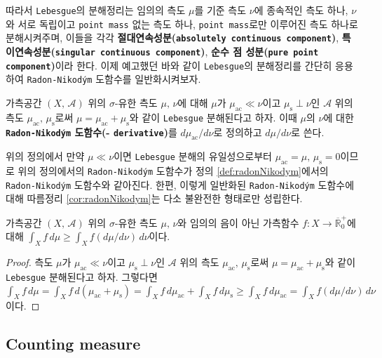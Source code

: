 따라서 \texttt{Lebesgue}의 분해정리는 임의의 측도 $\mu$를 기준 측도 $\nu$에 종속적인 측도 하나, $\nu$와 서로 독립이고 \texttt{point mass} 없는 측도 하나, \texttt{point mass}로만 이루어진 측도 하나로 분해시켜주며, 이들을 각각 \textbf{절대연속성분(\texttt{absolutely continuous component})}, \textbf{특이연속성분(\texttt{singular continuous component})}, \textbf{순수 점 성분(\texttt{pure point component})}이라 한다. 이제 예고했던 바와 같이 \texttt{Lebesgue}의 분해정리를 간단히 응용하여 \texttt{Radon-Nikod\'ym} 도함수를 일반화시켜보자.

\begin{definition}
    가측공간 $(X,\,\mathcal{A})$ 위의 $\sigma$-유한 측도 $\mu,\,\nu$에 대해 $\mu$가 $\mu_\mathrm{ac}\ll\nu$이고 $\mu_\mathrm{s}\perp\nu$인 $\mathcal{A}$ 위의 측도 $\mu_\mathrm{ac},\,\mu_\mathrm{s}$로써 $\mu=\mu_\mathrm{ac}+\mu_\mathrm{s}$와 같이 \texttt{Lebesgue} 분해된다고 하자. 이때 $\mu$의 $\nu$에 대한 \textbf{\texttt{Radon-Nikod\'ym} 도함수(- \texttt{derivative})}를 $d\mu_\mathrm{ac}/d\nu$로 정의하고 $d\mu/d\nu$로 쓴다.
\end{definition}

위의 정의에서 만약 $\mu\ll\nu$이면 \texttt{Lebesgue} 분해의 유일성으로부터  $\mu_\mathrm{ac}=\mu,\,\mu_\mathrm{s}=0$이므로 위의 정의에서의 \texttt{Radon-Nikod\'ym} 도함수가 정의 \ref{def:radonNikodym}에서의 \texttt{Radon-Nikod\'ym} 도함수와 같아진다. 한편, 이렇게 일반화된 \texttt{Radon-Nikod\'ym} 도함수에 대해 따름정리 \ref{cor:radonNikodym}는 다소 불완전한 형태로만 성립한다.

\begin{corollary}
    가측공간 $(X,\,\mathcal{A})$ 위의 $\sigma$-유한 측도 $\mu,\,\nu$와 임의의 음이 아닌 가측함수 $f:X\to\overline{\mathbb{R}}^+_0$에 대해 $\int_Xf\,d\mu\geq\int_Xf(d\mu/d\nu)\,d\nu$이다.
\end{corollary}

\begin{proof}
    측도 $\mu$가 $\mu_\mathrm{ac}\ll\nu$이고 $\mu_\mathrm{s}\perp\nu$인 $\mathcal{A}$ 위의 측도 $\mu_\mathrm{ac},\,\mu_\mathrm{s}$로써 $\mu=\mu_\mathrm{ac}+\mu_\mathrm{s}$와 같이 \texttt{Lebesgue} 분해된다고 하자. 그렇다면 $\int_Xf\,d\mu=\int_Xf\,d(\mu_\mathrm{ac}+\mu_\mathrm{s})=\int_Xf\,d\mu_\mathrm{ac}+\int_Xf\,d\mu_\mathrm{s}\geq\int_Xf\,d\mu_\mathrm{ac}=\int_Xf(d\mu/d\nu)\,d\nu$이다.
\end{proof}

\subsection{Counting measure}

